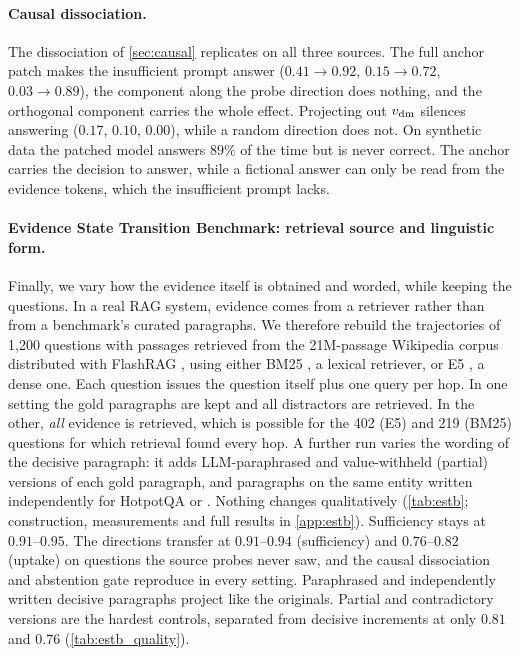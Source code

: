 \paragraph{Causal dissociation.}
The dissociation of \cref{sec:causal} replicates on all three sources. The full anchor patch makes the insufficient prompt answer ($0.41\to0.92$, $0.15\to0.72$, $0.03\to0.89$), the component along the probe direction does nothing, and the orthogonal component carries the whole effect. Projecting out $v_{\mathrm{dm}}$ silences answering ($0.17$, $0.10$, $0.00$), while a random direction does not. On synthetic data the patched model answers $89\%$ of the time but is never correct. The anchor carries the decision to answer, while a fictional answer can only be read from the evidence tokens, which the insufficient prompt lacks.

\paragraph{Evidence State Transition Benchmark: retrieval source and linguistic form.}
Finally, we vary how the evidence itself is obtained and worded, while keeping the \musique{} questions. In a real RAG system, evidence comes from a retriever rather than from a benchmark's curated paragraphs. We therefore rebuild the trajectories of 1{,}200 \musique{} questions with passages retrieved from the 21M-passage Wikipedia corpus distributed with FlashRAG \cite{jin2025flashrag,karpukhin2020dense}, using either BM25 \cite{robertson2009bm25}, a lexical retriever, or E5 \cite{wang2022e5}, a dense one. Each question issues the question itself plus one query per hop. In one setting the gold paragraphs are kept and all distractors are retrieved. In the other, \emph{all} evidence is retrieved, which is possible for the 402 (E5) and 219 (BM25) questions for which retrieval found every hop. A further run varies the wording of the decisive paragraph: it adds LLM-paraphrased and value-withheld (partial) versions of each gold paragraph, and paragraphs on the same entity written independently for HotpotQA or \twowiki{}. Nothing changes qualitatively (\cref{tab:estb}; construction, measurements and full results in \cref{app:estb}). Sufficiency stays at $0.91$--$0.95$. The \musique{} directions transfer at $0.91$--$0.94$ (sufficiency) and $0.76$--$0.82$ (uptake) on questions the source probes never saw, and the causal dissociation and abstention gate reproduce in every setting. Paraphrased and independently written decisive paragraphs project like the originals. Partial and contradictory versions are the hardest controls, separated from decisive increments at only $0.81$ and $0.76$ (\cref{tab:estb_quality}).

